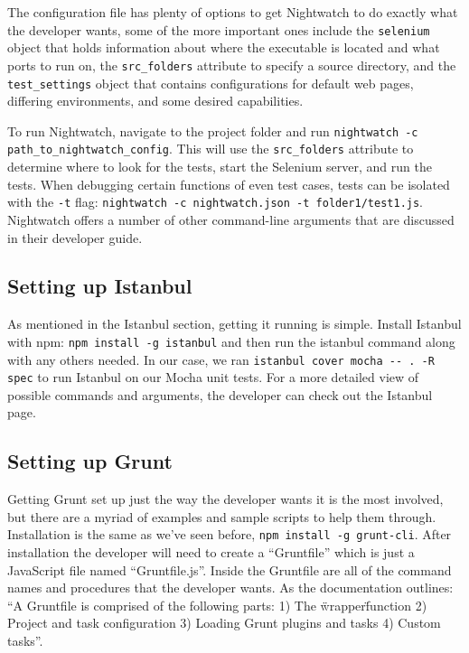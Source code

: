 \documentclass[12pt]{ucthesis}
\begin{document}
The configuration file has plenty of options to get Nightwatch to do exactly what the developer wants, some of the more important ones include the \lstinline{selenium} object that holds information about where the executable is located and what ports to run on, the \lstinline{src_folders} attribute to specify a source directory, and the \lstinline{test_settings} object that contains configurations for default web pages, differing environments, and some desired capabilities. 

To run Nightwatch, navigate to the project folder and run \lstinline{nightwatch -c path_to_nightwatch_config}. This will use the \lstinline{src_folders} attribute to determine where to look for the tests, start the Selenium server, and run the tests. When debugging certain functions of even test cases, tests can be isolated with the \lstinline{-t} flag: \lstinline{nightwatch -c nightwatch.json -t folder1/test1.js}. Nightwatch offers a number of other command-line arguments that are discussed in their developer guide\cite{NightwatchJS}.

\subsection{Setting up Istanbul}
As mentioned in the Istanbul section, getting it running is simple. Install Istanbul with npm: \lstinline{npm install -g istanbul} and then run the istanbul command along with any others needed. In our case, we ran \lstinline{istanbul cover mocha -- . -R spec} to run Istanbul on our Mocha unit tests. For a more detailed view of possible commands and arguments, the developer can check out the Istanbul page\cite{Istanbul}.

\subsection{Setting up Grunt}
Getting Grunt set up just the way the developer wants it is the most involved, but there are a myriad of examples and sample scripts to help them through. Installation is the same as we've seen before, \lstinline{npm install -g grunt-cli}. After installation the developer will need to create a ``Gruntfile'' which is just a JavaScript file named ``Gruntfile.js''. Inside the Gruntfile are all of the command names and procedures that the developer wants. As the documentation outlines: ``A Gruntfile is comprised of the following parts: 1) The \"wrapper\" function 2) Project and task configuration 3) Loading Grunt plugins and tasks 4) Custom tasks''\cite{GruntJS}.
\end{document}
